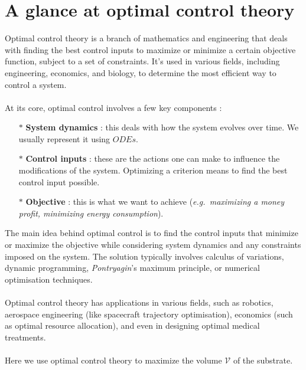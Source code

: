 \documentclass{tudelft-report}
\begin{document}
\chapter{A glance at optimal control theory}
\label{chapter:ocp}
\indent Optimal control theory is a branch of mathematics and engineering that deals with finding the best control inputs to maximize or minimize a certain objective function, subject to a set of constraints. It's used in various fields, including engineering, economics, and biology, to determine the most efficient way to control a system.\\
\\
At its core, optimal control involves a few key components :
\begin{itemize}
 \item[$*$] \textbf{System dynamics }: this deals with how the system evolves over time. We usually represent it using $ODEs$.
 \item[$*$] \textbf{Control inputs }: these are the actions one can make to influence the modifications of the system. Optimizing a criterion means to find the best control input possible.
 \item[$*$] \textbf{Objective }: this is what we want to achieve (\emph{e.g.\ maximizing a money profit, minimizing energy consumption}).
\end{itemize}\noindent
The main idea behind optimal control is to find the control inputs that minimize or maximize the objective while considering system dynamics and any constraints imposed on the system. The solution typically involves calculus of variations, dynamic programming, \textit{Pontryagin}'s maximum principle, or numerical optimisation techniques.\\ \\
Optimal control theory has applications in various fields, such as robotics, aerospace engineering (like spacecraft trajectory optimisation), economics (such as optimal resource allocation), and even in designing optimal medical treatments.\\ \\
Here we use optimal control theory to maximize the volume $\mathcal{V}$ of the substrate.
\end{document}
